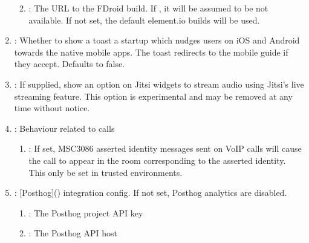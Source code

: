 \documentclass[letterpaper,10pt,openany,oneside,english]{sphinxmanual}
\begin{document}
\begin{enumerate}
\begin{enumerate}
\begin{description}
\end{description}

\item {} 
\sphinxAtStartPar
{}: The URL to the FDroid build. If , it will be assumed to be not available.
If not set, the default element.io builds will be used.

\end{enumerate}

\item {} 
\sphinxAtStartPar
{}: Whether to show a toast a startup which nudges users on
iOS and Android towards the native mobile apps. The toast redirects to the
mobile guide if they accept. Defaults to false.

\item {} 
\sphinxAtStartPar
{}: If supplied, show an option on Jitsi widgets to stream
audio using Jitsi’s live streaming feature. This option is experimental and
may be removed at any time without notice.

\item {} 
\sphinxAtStartPar
{}: Behaviour related to calls
\begin{enumerate}
%
\item {} 
\sphinxAtStartPar
{}: If set, MSC3086 asserted identity messages sent
on VoIP calls will cause the call to appear in the room corresponding to the
asserted identity. This  only be set in trusted environments.

\end{enumerate}

\item {} 
\sphinxAtStartPar
{}: {[}Posthog{]}() integration config. If not set, Posthog analytics are disabled.
\begin{enumerate}
%
\item {} 
\sphinxAtStartPar
{}: The Posthog project API key

\item {} 
\sphinxAtStartPar
{}: The Posthog API host

\end{enumerate}

\end{enumerate}
\end{document}
